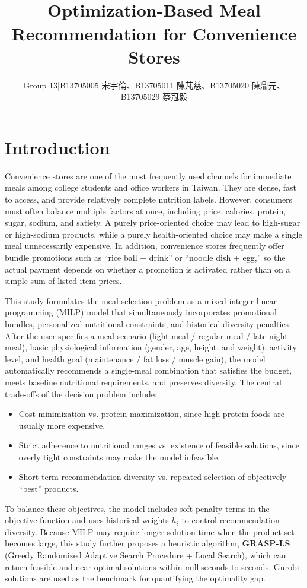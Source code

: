 \documentclass[a4paper]{article}
\title{\vspace{-1.2cm}{\fontsize{14}{17}\selectfont\bfseries 114-2 Operations Research Final Project}\\[8pt]
{\fontsize{16}{19}\selectfont\bfseries Optimization-Based Meal Recommendation for Convenience Stores}}
\author{Group 13\;|\;B13705005 宋宇倫、B13705011 陳芃慈、B13705020 陳鼎元、B13705029 蔡冠毅}
\date{}
\begin{document}
\maketitle
\vspace{-0.5cm}

\section{Introduction}
Convenience stores are one of the most frequently used channels for immediate meals among college students and office workers in Taiwan. They are dense, fast to access, and provide relatively complete nutrition labels. However, consumers must often balance multiple factors at once, including price, calories, protein, sugar, sodium, and satiety. A purely price-oriented choice may lead to high-sugar or high-sodium products, while a purely health-oriented choice may make a single meal unnecessarily expensive. In addition, convenience stores frequently offer bundle promotions such as ``rice ball + drink'' or ``noodle dish + egg,'' so the actual payment depends on whether a promotion is activated rather than on a simple sum of listed item prices.

This study formulates the meal selection problem as a mixed-integer linear programming (MILP) model that simultaneously incorporates promotional bundles, personalized nutritional constraints, and historical diversity penalties. After the user specifies a meal scenario (light meal / regular meal / late-night meal), basic physiological information (gender, age, height, and weight), activity level, and health goal (maintenance / fat loss / muscle gain), the model automatically recommends a single-meal combination that satisfies the budget, meets baseline nutritional requirements, and preserves diversity. The central trade-offs of the decision problem include:
\begin{itemize}
\item Cost minimization vs. protein maximization, since high-protein foods are usually more expensive.
\item Strict adherence to nutritional ranges vs. existence of feasible solutions, since overly tight constraints may make the model infeasible.
\item Short-term recommendation diversity vs. repeated selection of objectively ``best'' products.
\end{itemize}
To balance these objectives, the model includes soft penalty terms in the objective function and uses historical weights $h_i$ to control recommendation diversity. Because MILP may require longer solution time when the product set becomes large, this study further proposes a heuristic algorithm, \textbf{GRASP-LS} (Greedy Randomized Adaptive Search Procedure + Local Search), which can return feasible and near-optimal solutions within milliseconds to seconds. Gurobi solutions are used as the benchmark for quantifying the optimality gap.
\end{document}
